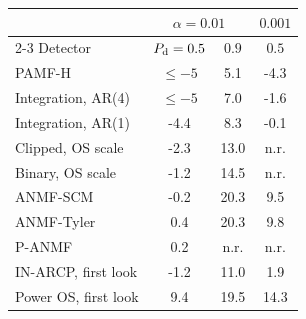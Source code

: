 \begin{tabular}{lccc}
\toprule
 & \multicolumn{2}{c}{$\alpha=0.01$} & $0.001$\\
\cmidrule(lr){2-3}
 Detector & $P_{\rm d}=0.5$ & $0.9$ & $0.5$\\
\midrule
PAMF-H & $\le-5$ & 5.1 & -4.3\\
Integration, AR(4) & $\le-5$ & 7.0 & -1.6\\
Integration, AR(1) & -4.4 & 8.3 & -0.1\\
Clipped, OS scale & -2.3 & 13.0 & n.r.\\
Binary, OS scale & -1.2 & 14.5 & n.r.\\
ANMF-SCM & -0.2 & 20.3 & 9.5\\
ANMF-Tyler & 0.4 & 20.3 & 9.8\\
P-ANMF & 0.2 & n.r. & n.r.\\
IN-ARCP, first look & -1.2 & 11.0 & 1.9\\
Power OS, first look & 9.4 & 19.5 & 14.3\\
\bottomrule
\end{tabular}

